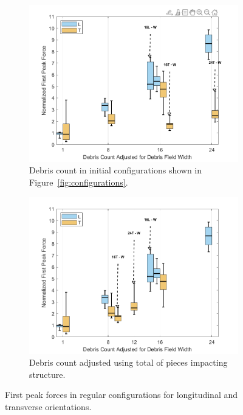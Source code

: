 \documentclass{article}
\begin{document}
\begin{figure}[htbp]
    \centering
    \begin{subfigure}[t]{0.9\textwidth}
        \centering
        \includegraphics[width=\textwidth]{FirstPeak_Regular_SplitByTrial.png}
        \caption{Debris count in initial configurations shown in Figure~\ref{fig:configurations}.}
        \label{fig:firstpeak_regular_original}
    \end{subfigure}
    \hfill
    \begin{subfigure}[t]{0.9\textwidth}
        \centering
        \includegraphics[width=\textwidth]{FirstPeak_Regular_RemappedT.png}
        \caption{Debris count adjusted using total of pieces impacting structure.}
        \label{fig:firstpeak_regular_remap}
    \end{subfigure}
    \caption{First peak forces in regular configurations for longitudinal and transverse orientations.}
    \label{fig:firstpeak_regular_split}
\end{figure}
\end{document}
